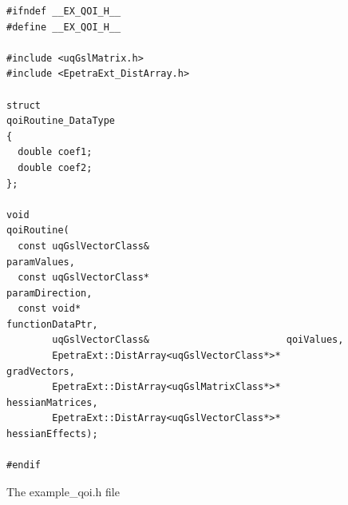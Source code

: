 \begin{figure}[h!]
\begin{center}
\begin{verbatim}
#ifndef __EX_QOI_H__
#define __EX_QOI_H__

#include <uqGslMatrix.h>
#include <EpetraExt_DistArray.h>

struct
qoiRoutine_DataType
{
  double coef1;
  double coef2;
};

void
qoiRoutine(
  const uqGslVectorClass&                        paramValues,
  const uqGslVectorClass*                        paramDirection,
  const void*                                    functionDataPtr,
        uqGslVectorClass&                        qoiValues,
        EpetraExt::DistArray<uqGslVectorClass*>* gradVectors,
        EpetraExt::DistArray<uqGslMatrixClass*>* hessianMatrices,
        EpetraExt::DistArray<uqGslVectorClass*>* hessianEffects);

#endif
\end{verbatim}
\end{center}
\caption{
The example\_qoi.h file
}
\label{fig-qoi-h}
\end{figure}

